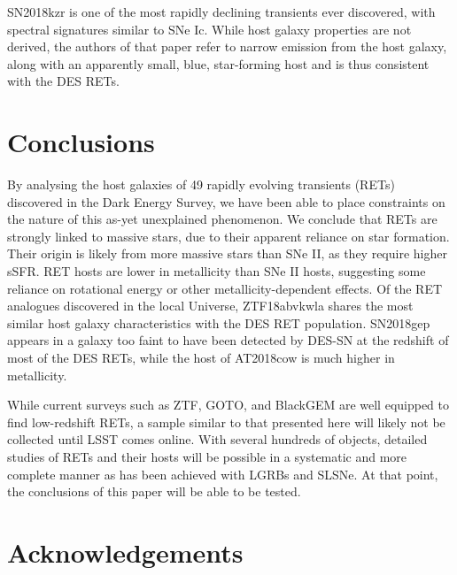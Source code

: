 \documentclass[fleqn,usenatbib,]{mnras}
\newcommand{\replychris}[1]{\color{magenta}#1 \color{black}}
\begin{document}
SN2018kzr \citep{McBrien2019} is one of the most rapidly declining transients ever discovered, with spectral signatures similar to SNe Ic. While host galaxy properties are not derived, the authors of that paper refer to narrow emission from the host galaxy, along with an apparently small, blue, star-forming host and is thus consistent with the DES RETs.


\section{Conclusions}
\label{sec:conc}
By analysing the host galaxies of 49 rapidly evolving transients (RETs) discovered in the Dark Energy Survey, we have been able to place constraints on the nature of this as-yet unexplained phenomenon. We conclude that RETs are strongly linked to massive stars, due to their apparent reliance on star formation. Their origin is likely from more massive stars than SNe II, as they require higher sSFR. RET hosts are lower in metallicity than SNe II hosts, suggesting some reliance on rotational energy or other metallicity-dependent effects.
Of the RET analogues discovered in the local Universe, ZTF18abvkwla shares the most similar host galaxy characteristics with the DES RET population. SN2018gep appears in a galaxy too faint to have been detected by DES-SN at the redshift of most of the DES RETs, while the host of AT2018cow is much higher in metallicity.

\replychris{While current surveys such as ZTF, GOTO, and BlackGEM are well equipped to find low-redshift RETs, a sample similar to that presented here will likely not be collected until LSST comes online. With several hundreds of objects, detailed studies of RETs and their hosts will be possible in a systematic and more complete manner as has been achieved with LGRBs and SLSNe. At that point, the conclusions of this paper will be able to be tested.}

\section*{Acknowledgements}
\end{document}
